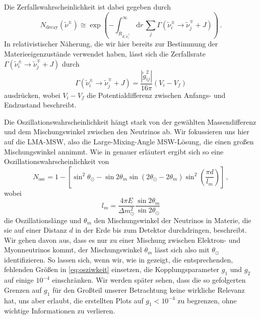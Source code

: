 Die Zerfallswahrscheinlichkeit ist dabei gegeben durch
\begin{equation}
    N_\text{decay}(\tilde{\nu}^\pm) \cong \exp \left(- \int^\infty_{R_{E, \tilde{\nu}^\pm_i}} \mathrm{d}r \, \sum_j \Gamma(\tilde{\nu}^\pm_i \rightarrow \tilde{\nu}^\mp_j + J) \right) \,.
    \label{eq:zerfallswkeit}
\end{equation}
In relativistischer Näherung, die wir hier bereits zur Bestimmung der Materieeigenzustände verwendet haben, lässt sich die Zerfallsrate $\Gamma(\tilde{\nu}^\pm_i \rightarrow \tilde{\nu}^\mp_j + J)$ durch
\begin{equation}
    \Gamma(\tilde{\nu}^\pm_i \rightarrow \tilde{\nu}^\mp_j + J) = \frac{|\tilde{g}^2_{i j}|}{16 \pi} \left(V_i - V_f \right)
    \label{eq:zerfallsrate}
\end{equation}
ausdrücken, wobei $V_i - V_f$ die Potentialdifferenz zwischen Anfangs- und Endzustand beschreibt.

Die Oszillationswahrscheinlichkeit hängt stark von der gewählten Massendifferenz und dem Mischungswinkel zwischen den Neutrinos ab.
Wir fokussieren uns hier auf die LMA-MSW, also die Large-Mixing-Angle MSW-Lösung, die einen großen Mischungswinkel annimmt.
Wie in \cite{ueberlebenswkeit} genauer erläutert ergibt sich so eine Oszillationswahrscheinlichkeit von
\begin{equation}
    N_\text{osc} = 1 - \left[\sin^2\theta_\odot - \sin 2\theta_m \sin\left(2\theta_\odot - 2 \theta_m\right) \sin^2 \left(\frac{\pi d}{l_m}\right)\right] \,,
    \label{eq:osziwkeit}
\end{equation}
wobei
\begin{equation*}
    l_m = \frac{4 \pi E}{\Delta m^2_\odot} \frac{\sin2\theta_m}{\sin2\theta_\odot}
\end{equation*}
die Oszillationslänge und $\theta_m$ den Mischungswinkel der Neutrinos in Materie, die sie auf einer Distanz $d$ in der Erde bis zum Detektor durchdringen, beschreibt.
Wir gehen davon aus, dass es nur zu einer Mischung zwischen Elektron- und Myonneutrinos kommt, der Mischungswinkel $\theta_m$ lässt sich also mit $\theta_\odot$ identifizieren.
So lassen sich, wenn wir, wie in \cite{supernovaboundsdasandere} gezeigt, die entsprechenden, fehlenden Größen in \eqref{eq:osziwkeit} einsetzen, die Kopplungsparameter $g_1$ und $g_2$ auf einige $10^{-4}$ einschränken.
Wir werden später sehen, dass die so gefolgerten Grenzen auf $g_1$ für den Großteil unserer Betrachtung keine wirkliche Relevanz hat, uns aber erlaubt, die erstellten Plots auf $g_1 < 10^{-4}$ zu begrenzen, ohne wichtige Informationen zu verlieren. 

